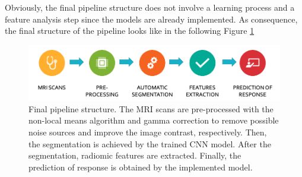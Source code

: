 \documentclass{standalone}
\begin{document}
Obviously, the final pipeline structure does not involve a learning process and a feature analysis step since the models are already implemented.
As consequence, the final structure of the pipeline looks like in the following Figure \ref{pipeline}
\begin{figure}[ht]

    \centering
    \includegraphics[width=\textwidth]{../images/finalpipeline.png}
    
    \caption{Final pipeline structure. The MRI scans are pre-processed with the non-local means algorithm and gamma correction to remove possible noise sources and improve the image contrast, respectively. Then, the segmentation is achieved by the trained CNN model. After the segmentation, radiomic features are extracted. Finally, the prediction of response is obtained by the implemented model.}
    \label{pipeline}
    
    \end{figure}
\end{document}
